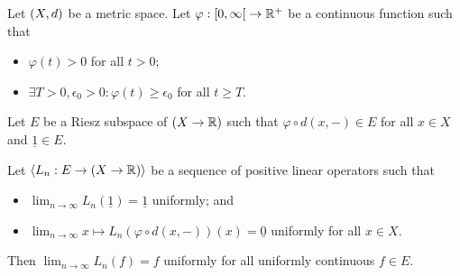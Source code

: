 \begin{theorem}[Korovkin]
Let $\sSet{X,d}$ be a metric space. Let $\varphi: \interval[co]{0,\infty} \to \R^+$ be a continuous function such that
\begin{itemize}
\item $\varphi(t) > 0$ for all $t>0$;
\item $\exists T>0, \epsilon_0>0: \varphi(t) \geq \epsilon_0$ for all $t\geq T$.
\end{itemize}
Let $E$ be a Riesz subspace of $(X\to \mathbb{R})$ such that $\varphi\circ d(x,-)\in E$ for all $x\in X$ and $\underline{1} \in E$.

Let $\left\langle L_n: E\to (X\to \mathbb{R}) \right\rangle$ be a sequence of positive linear operators such that
\begin{itemize}
\item $\lim_{n\to \infty} L_n(\underline{1}) = \underline{1}$ uniformly; and
\item $\lim_{n\to \infty} x\mapsto L_n(\varphi\circ d(x,-))(x) = \underline{0}$ uniformly for all $x\in X$.
\end{itemize}
Then $\lim_{n\to \infty}L_n(f) = f$ uniformly for all uniformly continuous $f\in E$.
\end{theorem}

